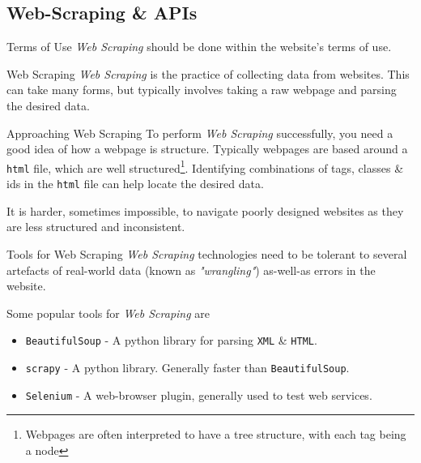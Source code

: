\documentclass[11pt,a4paper]{article}
\begin{document}
\subsection{Web-Scraping \& APIs}\label{sec_web_scraping_and_apis}

  \begin{remark}{Terms of Use}
    \textit{Web Scraping} should be done within the website's terms of use.
  \end{remark}

  \begin{definition}{Web Scraping}
    \textit{Web Scraping} is the practice of collecting data from websites. This can take many forms, but typically involves taking a raw webpage and parsing the desired data.
  \end{definition}

  \begin{proposition}{Approaching Web Scraping}
    To perform \textit{Web Scraping} successfully, you need a good idea of how a webpage is structure. Typically webpages are based around a \texttt{html} file, which are well structured\footnote{Webpages are often interpreted to have a tree structure, with each tag being a node}. Identifying combinations of tags, classes \& ids in the \texttt{html}  file can help locate the desired data.
    \par It is harder, sometimes impossible, to navigate poorly designed websites as they are less structured and inconsistent.
  \end{proposition}

  \begin{remark}{Tools for Web Scraping}
    \textit{Web Scraping} technologies need to be tolerant to several artefacts of real-world data (known as \textit{"wrangling"}) as-well-as errors in the website.
    \par Some popular tools for \textit{Web Scraping} are
    \begin{itemize}
      \item \texttt{BeautifulSoup} - A python library for parsing \texttt{XML} \& \texttt{HTML}.
      \item \texttt{scrapy} - A python library. Generally faster than \texttt{BeautifulSoup}.
      \item \texttt{Selenium} - A web-browser plugin, generally used to test web services.
    \end{itemize}
  \end{remark}
\end{document}
